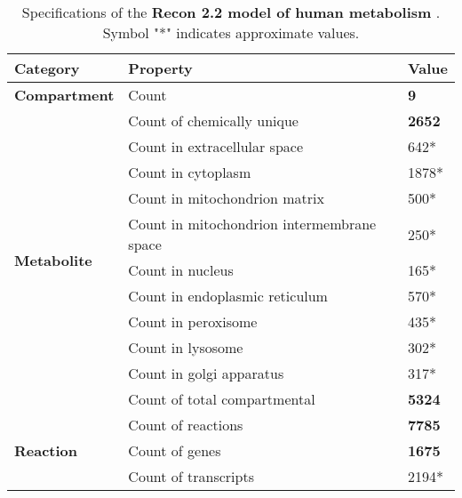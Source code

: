 
\begin{table}[htb]
\small
\centering
\begin{tabular}{ |m{3cm}|m{7.5cm}|m{1.5cm}| }


\hline
\textbf{Category}
& \textbf{Property}
& \textbf{Value}


\\ \hline
\multirow{1}{3cm}{\textbf{Compartment}}
& Count
& \textbf{9}


\\ \hline
\multirow{11}{3cm}{\textbf{Metabolite}}
& Count of chemically unique
& \textbf{2652}
\\ \cline{2-3}
& Count in extracellular space
& 642*
\\ \cline{2-3}
& Count in cytoplasm
& 1878*
\\ \cline{2-3}
& Count in mitochondrion matrix
& 500*
\\ \cline{2-3}
& Count in mitochondrion intermembrane space
& 250*
\\ \cline{2-3}
& Count in nucleus
& 165*
\\ \cline{2-3}
& Count in endoplasmic reticulum
& 570*
\\ \cline{2-3}
& Count in peroxisome
& 435*
\\ \cline{2-3}
& Count in lysosome
& 302*
\\ \cline{2-3}
& Count in golgi apparatus
& 317*
\\ \cline{2-3}
& Count of total compartmental
& \textbf{5324}


\\ \hline
\multirow{3}{3cm}{\textbf{Reaction}}
& Count of reactions
& \textbf{7785}
\\ \cline{2-3}
& Count of genes
& \textbf{1675}
\\ \cline{2-3}
& Count of transcripts
& 2194*

\\ \hline
\end{tabular}
\caption{Specifications of the \textbf{Recon 2.2 model of human metabolism} \supercite{thiele_community-driven_2013, swainston_recon_2016}. Symbol "*" indicates approximate values.}
\label{table:model}
\end{table}

